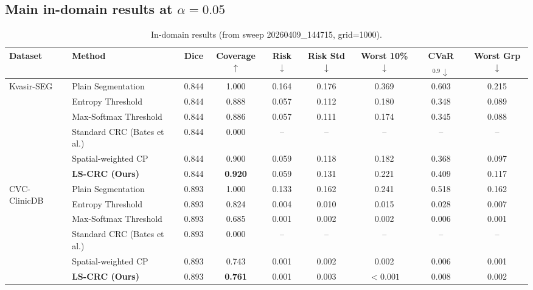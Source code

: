 \documentclass{article}
\begin{document}
\subsection{Main in-domain results at $\alpha=0.05$}
\begin{table}[t]
\centering
\small
\caption{In-domain results (from sweep 20260409\_144715, grid=1000).}
\label{tab:main}
\begin{tabular}{llccccccc}
\toprule
Dataset & Method & Dice & Coverage$\uparrow$ & Risk$\downarrow$ & Risk Std$\downarrow$ & Worst 10\%$\downarrow$ & CVaR$_{0.9}\downarrow$ & Worst Grp$\downarrow$ \\
\midrule
\multirow{6}{*}{Kvasir-SEG}
& Plain Segmentation & 0.844 & 1.000 & 0.164 & 0.176 & 0.369 & 0.603 & 0.215 \\
& Entropy Threshold & 0.844 & 0.888 & 0.057 & 0.112 & 0.180 & 0.348 & 0.089 \\
& Max-Softmax Threshold & 0.844 & 0.886 & 0.057 & 0.111 & 0.174 & 0.345 & 0.088 \\
& Standard CRC (Bates et al.) & 0.844 & 0.000 & -- & -- & -- & -- & -- \\
& Spatial-weighted CP & 0.844 & 0.900 & 0.059 & 0.118 & 0.182 & 0.368 & 0.097 \\
& \textbf{LS-CRC (Ours)} & 0.844 & \textbf{0.920} & 0.059 & 0.131 & 0.221 & 0.409 & 0.117 \\
\midrule
\multirow{6}{*}{CVC-ClinicDB}
& Plain Segmentation & 0.893 & 1.000 & 0.133 & 0.162 & 0.241 & 0.518 & 0.162 \\
& Entropy Threshold & 0.893 & 0.824 & 0.004 & 0.010 & 0.015 & 0.028 & 0.007 \\
& Max-Softmax Threshold & 0.893 & 0.685 & 0.001 & 0.002 & 0.002 & 0.006 & 0.001 \\
& Standard CRC (Bates et al.) & 0.893 & 0.000 & -- & -- & -- & -- & -- \\
& Spatial-weighted CP & 0.893 & 0.743 & 0.001 & 0.002 & 0.002 & 0.006 & 0.001 \\
& \textbf{LS-CRC (Ours)} & 0.893 & \textbf{0.761} & 0.001 & 0.003 & \textbf{$<0.001$} & 0.008 & 0.002 \\
\bottomrule
\end{tabular}
\end{table}
\end{document}
